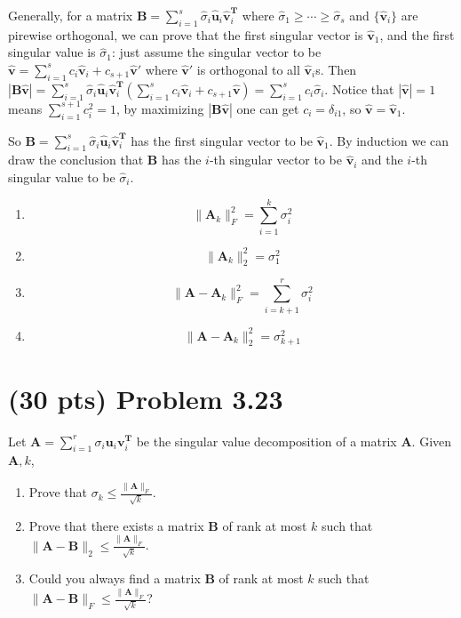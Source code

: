\documentclass[12pt]{article}
\begin{document}
Generally, for a matrix $\mathbf B = \sum_{i=1}^{s}\hat{\sigma}_i\hat{\mathbf u}_i\hat{\mathbf v}_i^{\mathbf T}$ where $\hat{\sigma}_1 \ge \cdots \ge \hat{\sigma}_s$ and $\{\hat{\mathbf v}_i\}$ are pirewise orthogonal, we can prove that the first singular vector is $\hat{\mathbf v}_1$, and the first singular value is $\hat{\sigma}_1$: just assume the singular vector to be $\hat{\mathbf v} = \sum_{i=1}^{s}c_i\hat{\mathbf{v}}_i + c_{s+1}\hat{\mathbf{v}}'$ where $\hat{\mathbf{v}}'$ is orthogonal to all $\hat{\mathbf v}_i$s. Then $|\mathbf B\hat{\mathbf v}| = \sum_{i=1}^{s}\hat{\sigma}_i\hat{\mathbf u}_i\hat{\mathbf v}_i^{\mathbf T}(\sum_{i=1}^{s}c_i\hat{\mathbf{v}}_i + c_{s+1}\hat{\mathbf{v}}) = \sum_{i=1}^sc_i\hat{\sigma}_i$. Notice that $|\hat{\mathbf v}| = 1$ means $\sum_{i=1}^{s+1}c_i^2 = 1$, by maximizing $|\mathbf B\hat{\mathbf v}|$ one can get $c_i = \delta_{i1}$, so $\hat{\mathbf v} = \hat{\mathbf v}_1$.

So $\mathbf B = \sum_{i=1}^{s}\hat{\sigma}_i\hat{\mathbf u}_i\hat{\mathbf v}_i^{\mathbf T}$ has the first singular vector to be $\hat{\mathbf v}_1$. By induction we can draw the conclusion that $\mathbf B$ has the $i$-th singular vector to be $\hat{\mathbf v}_i$ and the $i$-th singular value to be $\hat{\sigma}_i$.

\begin{enumerate}
	
	\item $$\|\mathbf A_k\|_F^2 = \sum_{i = 1}^{k}\sigma_i^2$$
	\item $$\|\mathbf A_k\|_2^2 = \sigma_1^2$$
	\item $$\|\mathbf A - \mathbf A_k\|_F^2 = \sum_{i = k + 1}^{r}\sigma_i^2$$
	\item $$\|\mathbf A - \mathbf A_k\|_2^2 = \sigma_{k+1}^2$$
\end{enumerate}


\section{(30 pts) Problem 3.23}
Let $\mathbf{A}=\sum_{i=1}^{r}{\sigma_i\mathbf{u}_i\mathbf{v}_i^\mathbf{T}}$ be the singular value decomposition of a matrix $\mathbf{A}$. Given $\mathbf{A},k$, 
   \begin{enumerate}
       \item Prove that $\sigma_k\le \frac{\| \mathbf{A} \|_F}{\sqrt{k}}$.
       \item Prove that there exists a matrix $\mathbf{B}$ of rank at most $k$ such that $\| \mathbf{A}-\mathbf{B} \|_2 \le \frac{\|\mathbf{A}\|_F}{\sqrt{k}}$.
       \item Could you always find a matrix $\mathbf{B}$ of rank at most $k$ such that $\| \mathbf{A}-\mathbf{B} \|_F \le \frac{\|\mathbf{A}\|_F}{\sqrt{k}}$?
   \end{enumerate}
\end{document}
